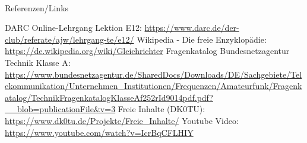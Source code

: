 \renewcommand{\refname}{Referenzen}

\hypertarget{refs}{}
\textcolor{white}{} \\ %
\Large Referenzen/Links
\footnotesize

\begin{thebibliography}{}
    DARC Online-Lehrgang Lektion E12:
    \url{https://www.darc.de/der-club/referate/ajw/lehrgang-te/e12/}
      Wikipedia - Die freie Enzyklopädie:
    \url{https://de.wikipedia.org/wiki/Gleichrichter}
     Fragenkatalog Bundesnetzagentur Technik Klasse A:
    \url{https://www.bundesnetzagentur.de/SharedDocs/Downloads/DE/Sachgebiete/Telekommunikation/Unternehmen_Institutionen/Frequenzen/Amateurfunk/Fragenkatalog/TechnikFragenkatalogKlasseAf252rId9014pdf.pdf?__blob=publicationFile&v=3}
      Freie Inhalte (DK0TU):
    \url{https://www.dk0tu.de/Projekte/Freie_Inhalte/}
      Youtube Video:
    \url{https://www.youtube.com/watch?v=IcrBqCFLHIY}

\end{thebibliography}


